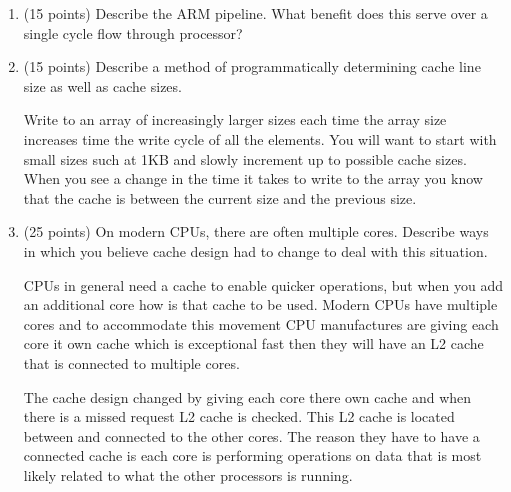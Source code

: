 \documentclass[letterpaper,10pt,onecolumn,titlepage]{article}
\begin{document}
\begin{enumerate}
\item (15 points) Describe the ARM pipeline. What benefit does this serve over a single 
  cycle flow through processor?
\begin{mdframed}[style=MyFrame, backgroundcolor=red]

\end{mdframed}

\item (15 points) Describe a method of programmatically determining cache line size as 
  well as cache sizes.
\begin{mdframed}[style=MyFrame]
Write to an array of increasingly larger sizes each time the array size increases time the write cycle of all the elements. You will want to start with small sizes such at 1KB and slowly increment up to possible cache sizes. When you see a change in the time it takes to write to the array you know that the cache is between the current size and the previous size.  
\end{mdframed}

\item (25 points) On modern CPUs, there are often multiple cores. Describe ways in which 
  you believe cache design had to change to deal with this situation.
\begin{mdframed}[style=MyFrame]
CPUs in general need a cache to enable quicker operations, but when you add an additional core how  is that cache to be used. Modern CPUs have multiple cores and to accommodate this movement CPU manufactures are giving each core it own cache which is exceptional fast then they will have an L2 cache that is connected to multiple cores.

The cache design changed by giving each core there own cache and when there is a missed request L2 cache is checked. This L2 cache is located between and connected to the other cores. The reason they have to have a connected cache is each core is performing operations on data that is most likely related to what the other processors is running. 
\end{mdframed}
\end{enumerate}

\newpage


\end{document}

